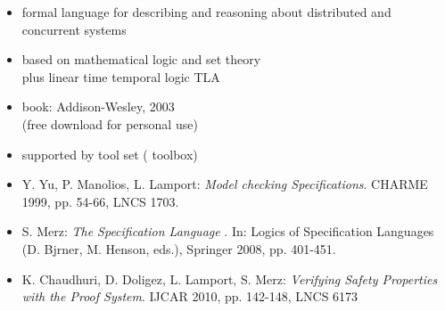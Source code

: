 \documentclass[fleqn]{beamer}
\begin{document}
\begin{frame}
\begin{minipage}{.7\linewidth}
    \begin{small}
    \begin{itemize}
    \item formal language for describing and reasoning about
      distributed and concurrent systems
\medskip
    \item based on mathematical logic and set theory\\
      plus linear time temporal logic TLA
\medskip
    \item book: Addison-Wesley, 2003\\
      (free download for personal use)
\medskip
    \item supported by tool set (\tlaplus{} toolbox)      
    \end{itemize}
    \end{small}
  \end{minipage}

  \pause
  \bigskip


  \begin{footnotesize}
  \begin{itemize}
  \item Y. Yu, P. Manolios, L. Lamport: \emph{Model checking \tlaplus{}
      Specifications}. CHARME 1999, pp. 54-66, LNCS 1703.
  \item S. Merz: \emph{The Specification Language \tlaplus}. In: Logics of
    Specification Languages (D. Bj{\slasho}rner, M. Henson, eds.), Springer
    2008, pp. 401-451.
  \item K. Chaudhuri, D. Doligez, L. Lamport, S. Merz: \emph{Verifying Safety
    Properties with the \tlaplus{} Proof System}. IJCAR 2010, pp. 142-148, LNCS 6173
  \end{itemize}
  \end{footnotesize}
\end{frame}
\end{document}
